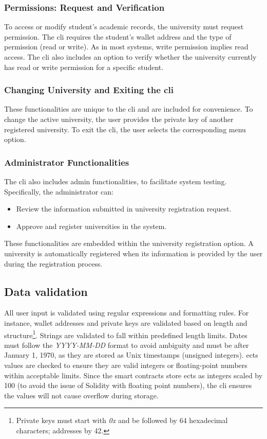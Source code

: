 \subsubsection{Permissions: Request and Verification}
To access or modify student's academic records, the university must request permission. The \acrshort{cli} requires the student's wallet address and the type of permission (read or write). As in most systems, write permission implies read access.
The \acrshort{cli} also includes an option to verify whether the university currently has read or write permission for a specific student.

\subsubsection{Changing University and Exiting the \acrshort{cli}}
These functionalities are unique to the \acrshort{cli} and are included for convenience. To change the active university, the user provides the private key of another registered university. To exit the \acrshort{cli}, the user selects the corresponding menu option.

\subsubsection{Administrator Functionalities}
The \acrshort{cli} also includes admin functionalities, to facilitate system testing. Specifically, the administrator can:
\begin{itemize}
    \item Review the information submitted in university registration request.
    \item Approve and register universities in the system.
\end{itemize}
These functionalities are embedded within the university registration option. A university is automatically registered when its information is provided by the user during the registration process.

\subsection{Data validation}
All user input is validated using regular expressions and formatting rules. For instance, wallet addresses and private keys are validated based on length and structure\footnote{Private keys must start with \textit{0x} and be followed by 64 hexadecimal characters; addresses by 42.}. Strings are validated to fall within predefined length limits. Dates must follow the \textit{YYYY-MM-DD} format to avoid ambiguity and must be after January 1, 1970, as they are stored as Unix timestamps (unsigned integers). \acrshort{ects} values are checked to ensure they are valid integers or floating-point numbers within acceptable limits. Since the smart contracts store \acrshort{ects} as integers scaled by 100 (to avoid the issue of Solidity with floating point numbers), the \acrshort{cli} ensures the values will not cause overflow during storage.